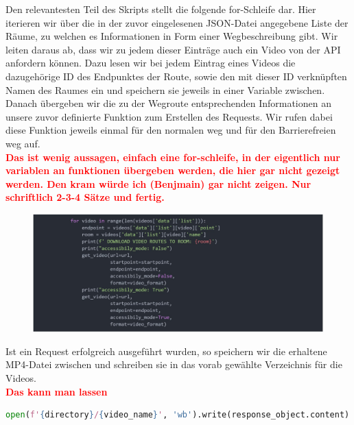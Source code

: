 
Den relevantesten Teil des Skripts stellt die folgende for-Schleife dar. Hier iterieren wir über die in der zuvor eingelesenen JSON-Datei angegebene Liste der Räume, zu welchen es Informationen in Form einer Wegbeschreibung gibt. Wir leiten daraus ab, dass wir zu jedem dieser Einträge auch ein Video von der API anfordern können. Dazu lesen wir bei jedem Eintrag eines Videos die dazugehörige ID des Endpunktes der Route, sowie den mit dieser ID verknüpften Namen des Raumes ein und speichern sie jeweils in einer Variable zwischen. Danach übergeben wir die zu der Wegroute entsprechenden Informationen an unsere zuvor definierte Funktion zum Erstellen des Requests. Wir rufen dabei diese Funktion jeweils einmal für den normalen weg und für den Barrierefreien weg auf.\\

\textcolor{red}{\textbf{Das ist wenig aussagen, einfach eine for-schleife, in der eigentlich nur variablen an funktionen übergeben werden, die hier gar nicht gezeigt werden. Den kram würde ich (Benjmain) gar nicht zeigen. Nur schriftlich 2-3-4 Sätze und fertig.}}

\begin{figure}[H]
    \includegraphics[width=\textwidth]{../Figures/3DNavigator/code03.jpg}
    \centering
\end{figure}\vspace{-2.5mm}

Ist ein Request erfolgreich ausgeführt wurden, so speichern wir die erhaltene MP4-Datei zwischen und schreiben sie in das vorab gewählte Verzeichnis für die Videos.\\

\textcolor{red}{\textbf{Das kann man lassen}}
\begin{lstlisting}[language=Python]
    open(f'{directory}/{video_name}', 'wb').write(response_object.content)
\end{lstlisting}


